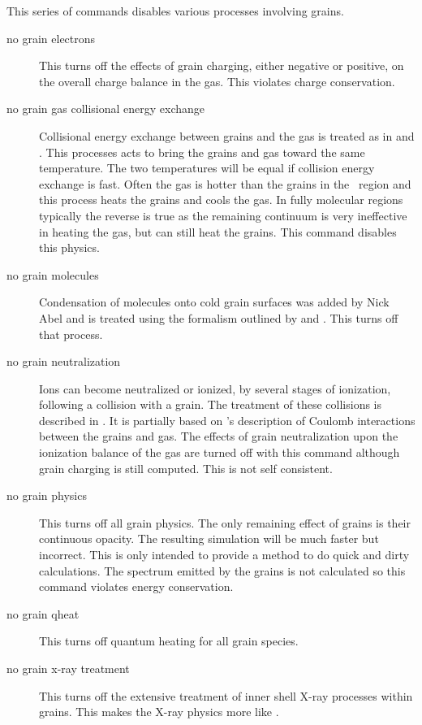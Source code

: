 This series of commands disables various processes involving grains.
\begin{description}
\item[no grain electrons]   This turns off the effects of grain charging, either
negative or positive, on the overall charge balance in the gas.  This
violates charge conservation.

\item[no grain gas collisional energy exchange]   Collisional energy exchange
between grains and the gas is treated as in \citet{VanHoof2004} and \citet{Abel2005}.   This processes acts to bring the grains and gas toward
the same temperature.  The two temperatures will be equal if collision energy
exchange is fast.  Often the gas is hotter than the grains in the \hplus\ region
and this process heats the grains and cools the gas.  In fully molecular
regions typically the reverse is true as the remaining continuum is very
ineffective in heating the gas, but can still heat the grains. This command
disables this physics.

\item[no grain molecules]  Condensation of molecules onto cold grain surfaces
was added by Nick Abel and is treated using the formalism outlined by
\citet{Hasegawa1992} and \citet{Hasegawa1993}.  This turns off that
process.

\item[no grain neutralization]  Ions can become neutralized or ionized, by
several stages of ionization, following a collision with a grain.
The treatment of these collisions is described in \citet{VanHoof2004}.
It is partially based on \citet{Draine1987}'s description of
Coulomb interactions between the grains and gas.
The effects of grain neutralization upon the ionization
balance of the gas are turned off with this command although grain charging
is still computed.  This is not self consistent.

\item[no grain physics]  This turns off all grain physics.  The only remaining
effect of grains is their continuous opacity.  The resulting simulation
will be much faster but incorrect.  This is only intended to provide a method
to do quick and dirty calculations. The spectrum emitted by the grains is
not calculated so this command violates energy conservation.

\item[no grain qheat]   This turns off quantum heating for all grain species.

\item[no grain x-ray treatment]  This turns off the
extensive treatment of inner
shell X-ray processes within grains.
This makes the X-ray physics more
like \citet{Weingartner2001a}.
\end{description}

